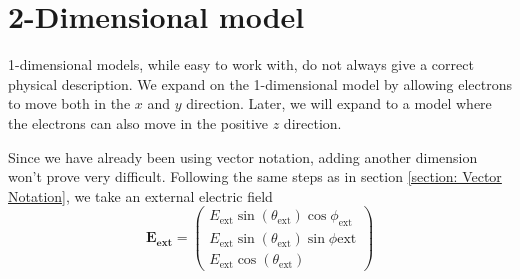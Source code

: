 \chapter{2-Dimensional model}
\label{chapter:2-Dimensional}

1-dimensional models, while easy to work with, do not always give a correct physical description. We expand on the 1-dimensional model by allowing electrons to move both in the $x$ and $y$ direction. Later, we will expand to a model where the electrons can also move in the positive $z$ direction.

Since we have already been using vector notation, adding another dimension won't prove very difficult. Following the same steps as in section \ref{section: Vector Notation}, we take an external electric field
\begin{equation}
    \mathbf{E_\text{ext}} = 
    \begin{pmatrix*}
        E_\text{ext} \sin(\theta_\text{ext}) \cos{\phi_\text{ext}} \\
        E_\text{ext} \sin(\theta_\text{ext}) \sin{\phi \text{ext}}\\
        E_\text{ext} \cos(\theta_\text{ext})
    \end{pmatrix*}
\end{equation}